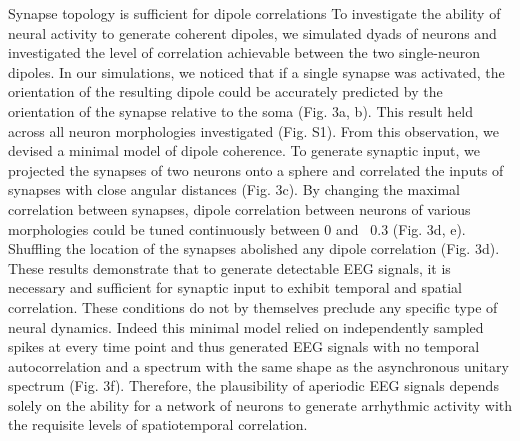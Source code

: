 Synapse topology is sufficient for dipole correlations
To investigate the ability of neural activity to generate coherent dipoles, we simulated dyads of neurons and investigated the level of correlation achievable between the two single-neuron dipoles. In our simulations, we noticed that if a single synapse was activated, the orientation of the resulting dipole could be accurately predicted by the orientation of the synapse relative to the soma (Fig. 3a, b). This result held across all neuron morphologies investigated (Fig. S1). From this observation, we devised a minimal model of dipole coherence. To generate synaptic input, we projected the synapses of two neurons onto a sphere and correlated the inputs of synapses with close angular distances (Fig. 3c). By changing the maximal correlation between synapses, dipole correlation between neurons of various morphologies could be tuned continuously between 0 and ~0.3 (Fig. 3d, e). Shuffling the location of the synapses abolished any dipole correlation (Fig. 3d). These results demonstrate that to generate detectable EEG signals, it is necessary and sufficient for synaptic input to exhibit temporal and spatial correlation. These conditions do not by themselves preclude any specific type of neural dynamics. Indeed this minimal model relied on independently sampled spikes at every time point and thus generated EEG signals with no temporal autocorrelation and a spectrum with the same shape as the asynchronous unitary spectrum (Fig. 3f). Therefore, the plausibility of aperiodic EEG signals depends solely on the ability for a network of neurons to generate arrhythmic activity with the requisite levels of spatiotemporal correlation. 

